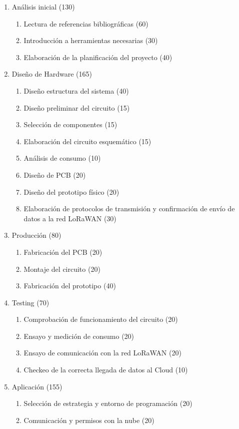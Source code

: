 \documentclass[11pt]{charter}
\begin{document}
\begin{enumerate}
\item Análisis inicial (130)
	\begin{enumerate}
	\item Lectura de referencias bibliográficas (60)
	\item Introducción a herramientas necesarias (30)
	\item Elaboración de la planificación del proyecto (40)
	\end{enumerate}
\item Diseño de Hardware (165)
	\begin{enumerate}
	\item Diseño estructura del sistema (40)
	\item Diseño preliminar del circuito (15)
	\item Selección de componentes (15)
	\item Elaboración del circuito esquemático (15)
	\item Análisis de consumo (10)
	\item Diseño de PCB (20)
	\item Diseño del prototipo físico (20)
	\item Elaboración de protocolos de transmisión y confirmación de envío de datos a la red LoRaWAN (30)
	\end{enumerate}
\item Producción (80)
	\begin{enumerate}
	\item Fabricación del PCB (20)
	\item Montaje del circuito (20)
	\item Fabricación del prototipo (40)
	\end{enumerate}
\item Testing (70)
	\begin{enumerate}
	\item Comprobación de funcionamiento del circuito (20)
	\item Ensayo y medición de consumo (20)
	\item Ensayo de comunicación con la red LoRaWAN (20)
	\item Checkeo de la correcta llegada de datos al Cloud (10)
	\end{enumerate}
\item Aplicación (155)
	\begin{enumerate}
	\item Selección de estrategia y entorno de programación (20)
	\item Comunicación y permisos con la nube (20)

\end{enumerate}
\end{enumerate}
\end{document}
